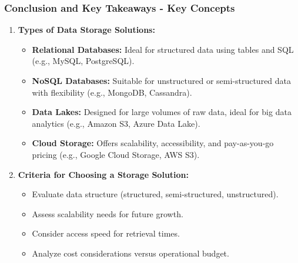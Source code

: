 \documentclass[aspectratio=169]{beamer}
\begin{document}
\begin{frame}[fragile]
    \frametitle{Conclusion and Key Takeaways - Key Concepts}
    \begin{enumerate}
        \item \textbf{Types of Data Storage Solutions:}
        \begin{itemize}
            \item \textbf{Relational Databases:} Ideal for structured data using tables and SQL (e.g., MySQL, PostgreSQL).
            \item \textbf{NoSQL Databases:} Suitable for unstructured or semi-structured data with flexibility (e.g., MongoDB, Cassandra).
            \item \textbf{Data Lakes:} Designed for large volumes of raw data, ideal for big data analytics (e.g., Amazon S3, Azure Data Lake).
            \item \textbf{Cloud Storage:} Offers scalability, accessibility, and pay-as-you-go pricing (e.g., Google Cloud Storage, AWS S3).
        \end{itemize}
        
        \item \textbf{Criteria for Choosing a Storage Solution:}
        \begin{itemize}
            \item Evaluate data structure (structured, semi-structured, unstructured).
            \item Assess scalability needs for future growth.
            \item Consider access speed for retrieval times.
            \item Analyze cost considerations versus operational budget.
        \end{itemize}
    \end{enumerate}
\end{frame}
\end{document}
